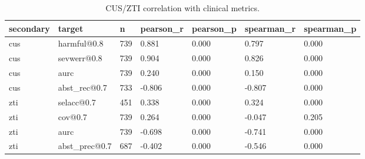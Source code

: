 \begin{table}[htbp]
\centering
\caption{CUS/ZTI correlation with clinical metrics.}
\label{tab:corr}
\begin{tabular}{lllllll}
\toprule
secondary & target & n & pearson\_r & pearson\_p & spearman\_r & spearman\_p \\
\midrule
cus & harmful@0.8 & 739 & 0.881 & 0.000 & 0.797 & 0.000 \\
cus & sevwerr@0.8 & 739 & 0.904 & 0.000 & 0.826 & 0.000 \\
cus & aurc & 739 & 0.240 & 0.000 & 0.150 & 0.000 \\
cus & abst\_rec@0.7 & 733 & -0.806 & 0.000 & -0.807 & 0.000 \\
zti & selacc@0.7 & 451 & 0.338 & 0.000 & 0.324 & 0.000 \\
zti & cov@0.7 & 739 & 0.264 & 0.000 & -0.047 & 0.205 \\
zti & aurc & 739 & -0.698 & 0.000 & -0.741 & 0.000 \\
zti & abst\_prec@0.7 & 687 & -0.402 & 0.000 & -0.546 & 0.000 \\
\bottomrule
\end{tabular}
\end{table}

